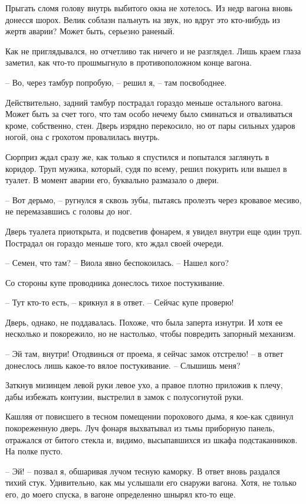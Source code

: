 \documentclass[a4paper]{book}
\begin{document}
Прыгать сломя голову внутрь выбитого окна не хотелось. Из недр вагона вновь донесся шорох. Велик соблазн пальнуть на звук, но вдруг это кто-нибудь из жертв аварии? Может быть, серьезно раненый.

Как не приглядывался, но отчетливо так ничего и не разглядел. Лишь краем глаза заметил, как что-то прошмыгнуло в противоположном конце вагона.

-- Во, через тамбур попробую, -- решил я, -- там посвободнее. 

Действительно, задний тамбур пострадал гораздо меньше остального вагона. Может быть за счет того, что там особо нечему было сминаться и отваливаться кроме, собственно, стен. Дверь изрядно перекосило, но от пары сильных ударов ногой, она с грохотом провалилась внутрь.

Сюрприз ждал сразу же, как только я спустился и попытался заглянуть в коридор. Труп мужика, который, судя по всему, решил покурить или вышел в туалет. В момент аварии его, буквально размазало о двери. 

-- Вот дерьмо, -- ругнулся я сквозь зубы, пытаясь пролезть через кровавое месиво, не перемазавшись с головы до ног. 

Дверь туалета приоткрыта, и подсветив фонарем, я увидел внутри еще один труп. Пострадал он гораздо меньше того, кто ждал своей очереди.

-- Семен, что там? -- Виола явно беспокоилась. -- Нашел кого?

Со стороны купе проводника донеслось тихое постукивание. 

-- Тут кто-то есть, -- крикнул я в ответ. -- Сейчас купе проверю!

Дверь, однако, не поддавалась. Похоже, что была заперта изнутри. И хотя ее несколько и покорежило, но не настолько, чтобы повредить запорный механизм. 

-- Эй там, внутри! Отодвинься от проема, я сейчас замок отстрелю! -- в ответ донеслось лишь какое-то вялое постукивание. -- Слышишь меня? 

Заткнув мизинцем левой руки левое ухо, а правое плотно приложив к плечу, дабы избежать контузии, выстрелил в замок с полусогнутой руки. 

Кашляя от повисшего в тесном помещении порохового дыма, я кое-как сдвинул покореженную дверь. Луч фонаря выхватывал из тьмы приборную панель, отражался от битого стекла и, видимо, высыпавшихся из шкафа подстаканников. На полке пусто.

-- Эй! -- позвал я, обшаривая лучом тесную каморку. В ответ вновь раздался тихий стук. Удивительно, как мы услышали его снаружи вагона. Хотя, не только его, до моего спуска, в вагоне определенно шнырял кто-то еще.
\end{document}
